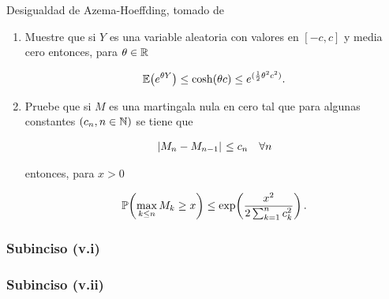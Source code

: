 Desigualdad de Azema-Hoeffding, tomado de \par
\cite[E14.2, p.237]{MR1155402}\pn

\begin{enumerate}
    \item[(v.i)]    [\ref{problema2_3:subinciso5_1}]
         Muestre que si $Y$ es una variable aleatoria con valores en $[-c,c]$ y media cero entonces, para $\theta\in\mathbb{R}$
        
        \begin{align}
            \mathbb{E}\! \left( e^{\theta Y} \right) \leq \cosh(\theta c)\leq e^{(\frac{1}{2}\theta^2c^2)}. 
        \end{align}\pn

    \item[(v.ii)]    [\ref{problema2_3:subinciso5_2}]
        Pruebe que si $M$ es una martingala nula en cero tal que para algunas constantes $\left( c_n,n\in\mathbb{N}\right) $ se tiene que
        
        \begin{align}
            \hspace{.25mm}\left|M_n-M_{n-1}\right|\hspace{.25mm}\leq c_n\quad\forall n
        \end{align}
        
        entonces, para $x>0$
        
        \begin{align}
            \mathbb{P}\! \left( \max_{k\leq n} M_k\geq x \right)\leq \exp\!\left( \frac{x^2}{2\sum_{k=1}^n c_k^2}\right) .
        \end{align}
\end{enumerate}
    
\subsubsection{Subinciso (v.i)}     \label{problema2_3:subinciso5_1}
    
    \newpage
    
\subsubsection{Subinciso (v.ii)}    \label{problema2_3:subinciso5_2} 
    

